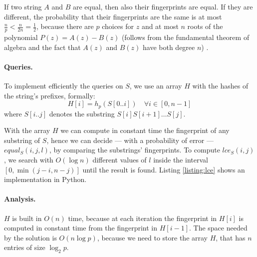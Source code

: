 If two string $A$ and $B$ are equal, then also their fingerprints are equal. If they are different, the probability that their fingerprints are the same is at most $\frac{n}{p}<\frac{n}{2n}=\frac{1}{2}$, because there are $p$ choices for $z$ and at most $n$ roots of the polynomial $P(z)=A(z)-B(z)$ (follows from the  fundamental theorem of algebra and the fact that $A(z)$ and $B(z)$ have both degree $n$) \cite[169]{Motwani10}.

\paragraph{Queries.} To implement efficiently the queries on $S$, we use an array $H$ with the hashes of the string's prefixes, formally: 
$$H[i]=h_p(S[0..i]) \quad \forall i \in [0, n-1]$$
where $S[i..j]$ denotes the substring $S[i]S[i+1] \dots S[j]$.

With the array $H$ we can compute in constant time the fingerprint of any substring of $S$, hence we can decide --- with a probability of error --- $equal_S(i,j,l)$, by comparing the substrings' fingerprints. To compute $lce_S(i,j)$, we search with $O(\log n)$ different values of $l$ inside the interval $[0, \min(j-i,n-j)]$ until the result is found. Listing \ref{listing:lce} shows an implementation in Python.

\paragraph{Analysis.} $H$ is built in $O(n)$ time, because at each iteration the fingerprint in $H[i]$ is computed in constant time from the fingerprint in $H[i-1]$. The space needed by the solution is $O(n \log p)$, because we need to store the array $H$, that has $n$ entries of size $\log_2 p$. 

